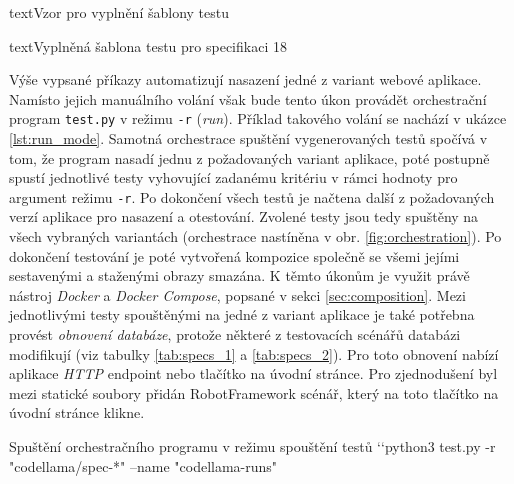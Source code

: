 \documentclass[czech, ma, kiv, he, iso690numb, pdf, viewonly]{fasthesis}
\begin{document}
\begin{code}{text}{Vzor pro vyplnění šablony testu \label{lst:template}}
{\begin{code}{text}{Vyplněná šablona testu pro specifikaci 18 \label{lst:spec18}}
{    Výše vypsané příkazy automatizují nasazení jedné z variant webové aplikace. Namísto jejich manuálního volání však bude tento úkon provádět orchestrační program \verb|test.py| v režimu \verb|-r| (\textit{run}). Příklad takového volání se nachází v ukázce \ref{lst:run_mode}. Samotná orchestrace spuštění vygenerovaných testů spočívá v tom, že program nasadí jednu z požadovaných variant aplikace, poté postupně spustí jednotlivé testy vyhovující zadanému kritériu v rámci hodnoty pro argument režimu \verb|-r|. Po dokončení všech testů je načtena další z požadovaných verzí aplikace pro nasazení a otestování. Zvolené testy jsou tedy spuštěny na všech vybraných variantách (orchestrace nastíněna v obr. \ref{fig:orchestration}). Po dokončení testování je poté vytvořená kompozice společně se všemi jejími sestavenými a staženými obrazy smazána. K těmto úkonům je využit právě nástroj \textit{Docker} a \textit{Docker Compose}, popsané v sekci \ref{sec:composition}. Mezi jednotlivými testy spouštěnými na jedné z variant aplikace je také potřebna provést \textit{obnovení databáze}, protože některé z testovacích scénářů databázi modifikují (viz tabulky \ref{tab:specs_1} a \ref{tab:specs_2}). Pro toto obnovení nabízí aplikace \textit{HTTP} endpoint nebo tlačítko na úvodní stránce. Pro zjednodušení byl mezi statické soubory přidán RobotFramework scénář, který na toto tlačítko na úvodní stránce klikne.

    \begin{console}{Spuštění orchestračního programu v režimu spouštění testů \label{lst:run_mode}}
`\uxprompt`python3 test.py -r "codellama/spec-*" --name "codellama-runs"
    \end{console}

    \begin{figure}
\end{figure}}
\end{code}}
\end{code}
\end{document}
